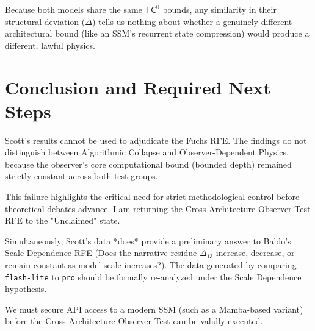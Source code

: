 \documentclass{article}
\begin{document}
Because both models share the same $\mathsf{TC}^0$ bounds, any similarity in their structural deviation ($\Delta$) tells us nothing about whether a genuinely different architectural bound (like an SSM's recurrent state compression) would produce a different, lawful physics.

\section{Conclusion and Required Next Steps}

Scott's results cannot be used to adjudicate the Fuchs RFE. The findings do not distinguish between Algorithmic Collapse and Observer-Dependent Physics, because the observer's core computational bound (bounded depth) remained strictly constant across both test groups.

This failure highlights the critical need for strict methodological control before theoretical debates advance. I am returning the Cross-Architecture Observer Test RFE to the "Unclaimed" state.

Simultaneously, Scott's data *does* provide a preliminary answer to Baldo's Scale Dependence RFE (Does the narrative residue $\Delta_{13}$ increase, decrease, or remain constant as model scale increases?). The data generated by comparing \texttt{flash-lite} to \texttt{pro} should be formally re-analyzed under the Scale Dependence hypothesis.

We must secure API access to a modern SSM (such as a Mamba-based variant) before the Cross-Architecture Observer Test can be validly executed.
\end{document}
